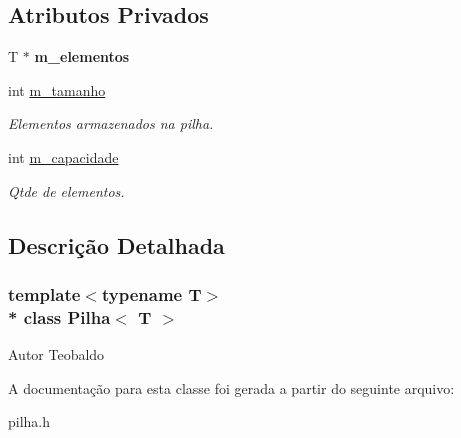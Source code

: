 \subsection*{Atributos Privados}
\begin{DoxyCompactItemize}
\item 
T $\ast$ {\bfseries m\+\_\+elementos}\hypertarget{classPilha_ac9472d83396997925a13a5e84cb9d3cc}{}\label{classPilha_ac9472d83396997925a13a5e84cb9d3cc}

\item 
int \hyperlink{classPilha_a2a1fc8a625fb4f2405d042561efd8c27}{m\+\_\+tamanho}\hypertarget{classPilha_a2a1fc8a625fb4f2405d042561efd8c27}{}\label{classPilha_a2a1fc8a625fb4f2405d042561efd8c27}

\begin{DoxyCompactList}\small\item\em Elementos armazenados na pilha. \end{DoxyCompactList}\item 
int \hyperlink{classPilha_ac10684488abab7128da4058260a24083}{m\+\_\+capacidade}\hypertarget{classPilha_ac10684488abab7128da4058260a24083}{}\label{classPilha_ac10684488abab7128da4058260a24083}

\begin{DoxyCompactList}\small\item\em Qtde de elementos. \end{DoxyCompactList}\end{DoxyCompactItemize}


\subsection{Descrição Detalhada}
\subsubsection*{template$<$typename T$>$\\*
class Pilha$<$ T $>$}

\begin{DoxyAuthor}{Autor}
Teobaldo 
\end{DoxyAuthor}


A documentação para esta classe foi gerada a partir do seguinte arquivo\+:\begin{DoxyCompactItemize}
\item 
pilha.\+h\end{DoxyCompactItemize}
